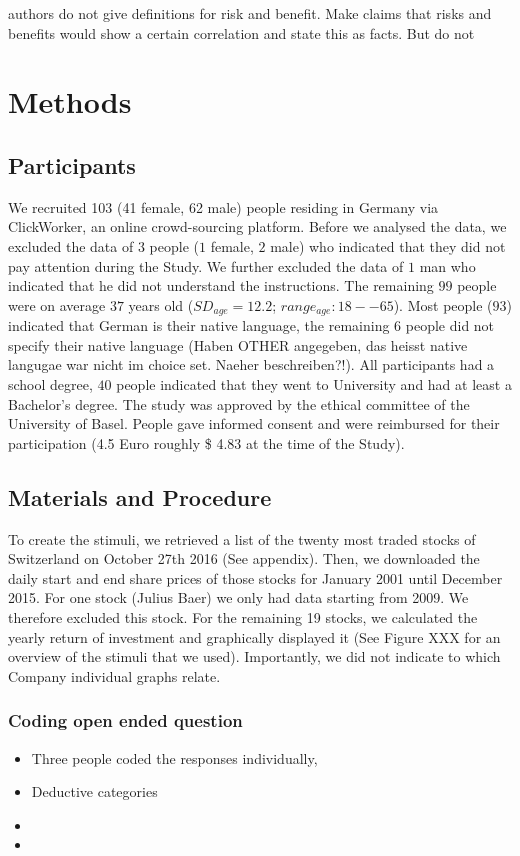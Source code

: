 \documentclass[a4paper,doc, natbib]{apa6} %
\begin{document}
authors do not give definitions for risk and benefit. Make claims that risks and benefits would show a certain correlation and state this as facts. But do not
\section{Methods}
\subsection{Participants}
We recruited 103 (41 female, 62 male) people residing in Germany via ClickWorker, an online crowd-sourcing platform. 
Before we analysed the data, we excluded the data of $3$ people ($1$ female, $2$ male) who indicated that they did not pay attention during the Study. We further excluded the data of $1$ man who indicated that he did not understand the instructions. The remaining $99$ people were on average $37$ years old ($SD_{age} = 12.2$; $range_{age}: 18 -- 65$). Most people ($93$) indicated that German is their native language, the remaining $6$ people did not specify their native language (Haben OTHER angegeben, das heisst native langugae war nicht im choice set. Naeher beschreiben?!). All participants had a school degree, $40$ people indicated that they went to University and had at least a Bachelor's degree. 
The study was approved by the ethical committee of the University of Basel. People gave informed consent and were reimbursed for their participation (4.5 Euro roughly \$ 4.83 at the time of the Study).


\subsection{Materials and Procedure}
To create the stimuli, we retrieved a list of the twenty most traded stocks of Switzerland on October 27th 2016 (See appendix). Then, we downloaded the daily start and end share prices of those stocks for January 2001 until December 2015. For one stock (Julius Baer) we only had data starting from 2009. We therefore excluded this stock. For the remaining 19 stocks, we calculated the yearly return of investment and graphically displayed it (See Figure XXX for an overview of the stimuli that we used). Importantly, we did not indicate to which Company individual graphs relate. 


\subsubsection{Coding open ended question}
\begin{itemize}
\item Three people coded the responses individually, 
\item Deductive categories
\item 
\item 
\end{itemize}
\end{document}

